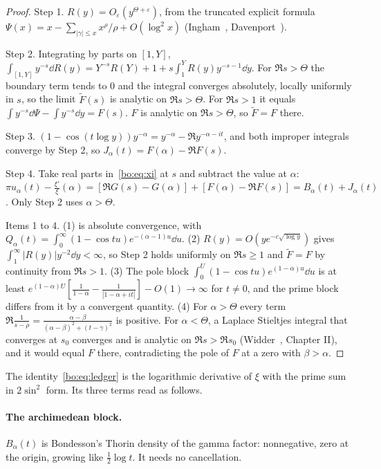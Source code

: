 \begin{proof}
Step 1. $R(y)=O_\varepsilon(y^{\Theta+\varepsilon})$, from the truncated explicit formula $\Psi(x)=x-\sum_{|\gamma|\le x}x^\rho/\rho+O(\log^2x)$ (Ingham~\cite{Ingham32}, Davenport~\cite{Davenport}).

Step 2. Integrating by parts on $[1,Y]$, $\int_{[1,Y]}y^{-s}\dd R(y)=Y^{-s}R(Y)+1+s\int_1^YR(y)y^{-s-1}\dd y$. For $\Re s>\Theta$ the boundary term tends to $0$ and the integral converges absolutely, locally uniformly in $s$, so the limit $\tilde F(s)$ is analytic on $\Re s>\Theta$. For $\Re s>1$ it equals $\int y^{-s}\dd\Psi-\int y^{-s}\dd y=F(s)$. $F$ is analytic on $\Re s>\Theta$, so $\tilde F=F$ there.

Step 3. $(1-\cos(t\log y))y^{-\alpha}=y^{-\alpha}-\Re y^{-\alpha-it}$, and both improper integrals converge by Step 2, so $J_\alpha(t)=F(\alpha)-\Re F(s)$.

Step 4. Take real parts in~\eqref{bo:eq:xi} at $s$ and subtract the value at $\alpha$: $\pi u_\alpha(t)-\frac{\xi'}{\xi}(\alpha)=[\Re G(s)-G(\alpha)]+[F(\alpha)-\Re F(s)]=B_\alpha(t)+J_\alpha(t)$. Only Step 2 uses $\alpha>\Theta$.

Items 1 to 4. (1) is absolute convergence, with $Q_\alpha(t)=\int_0^\infty(1-\cos tu)e^{-(\alpha-1)u}\dd u$. (2) $R(y)=O(ye^{-c\sqrt{\log y}})$ gives $\int_1^\infty|R(y)|y^{-2}\dd y<\infty$, so Step 2 holds uniformly on $\Re s\ge1$ and $\tilde F=F$ by continuity from $\Re s>1$. (3) The pole block $\int_0^U(1-\cos tu)e^{(1-\alpha)u}\dd u$ is at least $e^{(1-\alpha)U}[\frac1{1-\alpha}-\frac1{|1-\alpha+it|}]-O(1)\to\infty$ for $t\ne0$, and the prime block differs from it by a convergent quantity. (4) For $\alpha>\Theta$ every term $\Re\frac1{s-\rho}=\frac{\alpha-\beta}{(\alpha-\beta)^2+(t-\gamma)^2}$ is positive. For $\alpha<\Theta$, a Laplace Stieltjes integral that converges at $s_0$ converges and is analytic on $\Re s>\Re s_0$ (Widder~\cite{Widder41}, Chapter II), and it would equal $F$ there, contradicting the pole of $F$ at a zero with $\beta>\alpha$.
\end{proof}

The identity~\eqref{bo:eq:ledger} is the logarithmic derivative of $\xi$ with the prime sum in $2\sin^2$ form. Its three terms read as follows.

\paragraph{The archimedean block.} $B_\alpha(t)$ is Bondesson's Thorin density of the gamma factor: nonnegative, zero at the origin, growing like $\frac12\log t$. It needs no cancellation.

